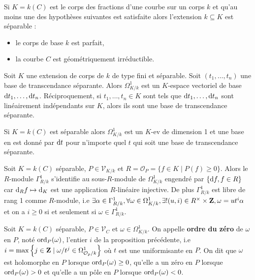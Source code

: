 	\begin{pop}
		Si $K = k(C)$ est le corps des fractions d'une courbe sur un corps $k$ et qu'au moins une des hypothèses suivantes est satisfaite alors l'extension $k \subseteq K$ est séparable :
		\begin{itemize}
			\item[\textbullet] le corps de base $k$ est parfait,
			\item[\textbullet] la courbe $C$ est géométriquement irréductible.
		\end{itemize}
	\end{pop}

	\begin{pop}
		Soit $K$ une extension de corps de $k$ de type fini et séparable.
		Soit $(t_1,\ldots,t_n)$ une base de transcendance séparante.
		Alors $\Omega_{K/k}^1$ est un $K$-espace vectoriel de base $\mathop{}\mathopen{}\mathrm{d} t_1,\ldots,\mathop{}\mathopen{}\mathrm{d} t_n$.
		Réciproquement, si $t_1,\ldots,t_n \in K$ sont tels que $\mathop{}\mathopen{}\mathrm{d} t_1,\ldots,\mathop{}\mathopen{}\mathrm{d} t_n$ sont linéairement indépendants sur $K$, alors ils sont une base de transcendance séparante.
	\end{pop}
	
	\begin{cor}
		Si $K = k(C)$ est séparable alors $\Omega^1_{K/k}$ est un $K$-ev de dimension 1 et une base en est donné par $\mathop{}\mathopen{}\mathrm{d} t$ pour n'importe quel $t$ qui soit une base de transcendance séparante.
	\end{cor}
	
	\begin{pop}
		Soit $K = k(C)$ séparable, $P \in \mathscr{V}_{K/k}$ et $R = \mathcal{O}_P = \{ f \in K \mid P(f) \geq 0 \}$.
		Alors le $R$-module $\Gamma_{R/k}^1$ s'identifie au sous-$R$-module de $\Omega^1_{K/k}$ engendré par $\{ \mathop{}\mathopen{}\mathrm{d} f, f \in R \}$ car $\mathop{}\mathopen{}\mathrm{d}_R f \mapsto \mathop{}\mathopen{}\mathrm{d}_K$ est une application $R$-linéaire injective.
		De plus $\Gamma_{R/k}^1$ est libre de rang 1 comme $R$-module, i.e $\exists \alpha \in \Gamma_{R/k}^1, \forall \omega \in \Omega^1_{K/k}, \exists ! (u,i) \in R^\times \times \mathbf{Z}, \omega = u t^i \alpha$ et on a $i \geq 0$ si et seulement si $\omega \in \Gamma_{R/k}^1$.
	\end{pop}
	
	\begin{defn}
		Soit $K = k(C)$ séparable, $P \in \mathscr{V}_C$ et $\omega \in \Omega^1_{K/k}$.
		On appelle \textbf{ordre du zéro} de $\omega$ en $P$, noté $\operatorname{ord}_P(\omega)$, l'entier $i$ de la proposition précédente, i.e $i = \max \left\{ j \in \mathbf{Z} \mid \omega / t^j \in \Omega^1_{\mathcal{O}_p/k} \right\}$ où $t$ est une uniformisante en $P$.
		On dit que $\omega$ est holomorphe en $P$ lorsque $\operatorname{ord}_P(\omega) \geq 0$, qu'elle a un zéro en $P$ lorsque $\operatorname{ord}_P(\omega) > 0$ et qu'elle a un pôle en $P$ lorsque $\operatorname{ord}_P(\omega) < 0$.
	\end{defn}
	
